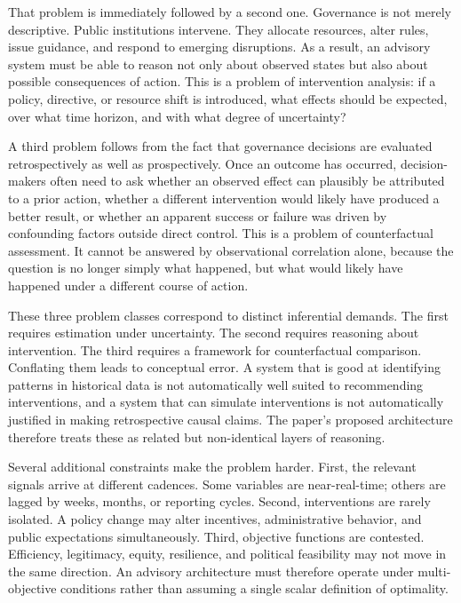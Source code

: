\documentclass[11pt]{article}
\begin{document}
That problem is immediately followed by a second one. Governance is not merely descriptive. Public institutions intervene. They allocate resources, alter rules, issue guidance, and respond to emerging disruptions. As a result, an advisory system must be able to reason not only about observed states but also about possible consequences of action. This is a problem of intervention analysis: if a policy, directive, or resource shift is introduced, what effects should be expected, over what time horizon, and with what degree of uncertainty?

A third problem follows from the fact that governance decisions are evaluated retrospectively as well as prospectively. Once an outcome has occurred, decision-makers often need to ask whether an observed effect can plausibly be attributed to a prior action, whether a different intervention would likely have produced a better result, or whether an apparent success or failure was driven by confounding factors outside direct control. This is a problem of counterfactual assessment. It cannot be answered by observational correlation alone, because the question is no longer simply what happened, but what would likely have happened under a different course of action.

These three problem classes correspond to distinct inferential demands. The first requires estimation under uncertainty. The second requires reasoning about intervention. The third requires a framework for counterfactual comparison. Conflating them leads to conceptual error. A system that is good at identifying patterns in historical data is not automatically well suited to recommending interventions, and a system that can simulate interventions is not automatically justified in making retrospective causal claims. The paper's proposed architecture therefore treats these as related but non-identical layers of reasoning.

Several additional constraints make the problem harder. First, the relevant signals arrive at different cadences. Some variables are near-real-time; others are lagged by weeks, months, or reporting cycles. Second, interventions are rarely isolated. A policy change may alter incentives, administrative behavior, and public expectations simultaneously. Third, objective functions are contested. Efficiency, legitimacy, equity, resilience, and political feasibility may not move in the same direction. An advisory architecture must therefore operate under multi-objective conditions rather than assuming a single scalar definition of optimality.
\end{document}
